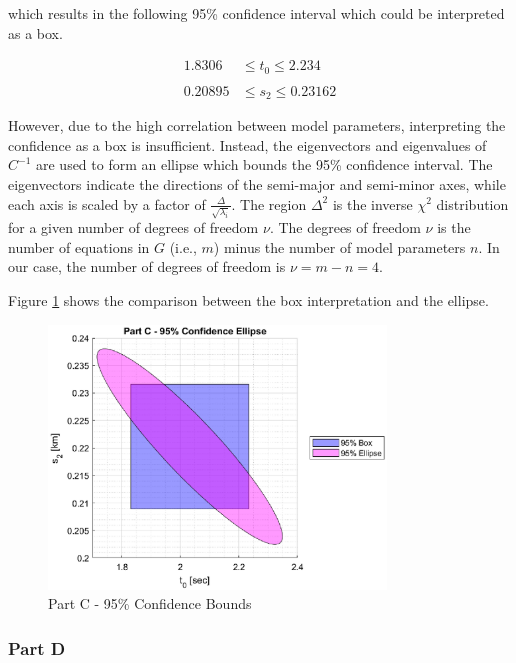 which results in the following 95\% confidence interval which could be interpreted as a box. 

\begin{align*}
	\textrm{1.8306} &\leq t_0 \leq \textrm{2.234} \\
	\\
	\textrm{0.20895} &\leq s_2 \leq \textrm{0.23162}
\end{align*}

However, due to the high correlation between model parameters, interpreting the confidence as a box is insufficient. Instead, the eigenvectors and eigenvalues of $C^{-1}$ are used to form an ellipse which bounds the 95\% confidence interval. The eigenvectors indicate the directions of the semi-major and semi-minor axes, while each axis is scaled by a factor of $\frac{\Delta}{\sqrt{\lambda_i}}$. The region $\Delta^2$ is the inverse $\chi^2$ distribution for a given number of degrees of freedom $\nu$. The degrees of freedom $\nu$ is the number of equations in $G$ (i.e., $m$) minus the number of model parameters $n$. In our case, the number of degrees of freedom is $\nu = m - n = 4$. 

Figure \ref{fig: prob1 partC} shows the comparison between the box interpretation and the ellipse. 

\begin{figure}[h] 
	\centering
	\includegraphics[width=0.8\textwidth]{./images/prob1_partC.eps}
	\caption{Part C - 95\% Confidence Bounds}
	\label{fig: prob1 partC}
\end{figure}
\FloatBarrier


\subsubsection{Part D}

